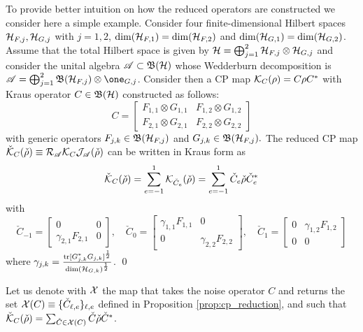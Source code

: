 \documentclass[aihp,12pt]{imsart}
\begin{document}
\begin{example}
    To provide better intuition on how the reduced operators are constructed we consider here a simple example. Consider four finite-dimensional Hilbert spaces $\mathcal{H}_{F,j},\mathcal{H}_{G,j}$ with $j=1,2$, $\dim(\mathcal{H}_{F,1}) = \dim(\mathcal{H}_{F,2})$ and $\dim(\mathcal{H}_{G,1}) = \dim(\mathcal{H}_{G,2})$. Assume that the total Hilbert space is given by $\mathcal{H}=\bigoplus_{j=1}^2 \mathcal{H}_{F,j}\otimes\mathcal{H}_{G,j}$ and consider the unital algebra $\mathscr{A}\subset\mathfrak{B}(\mathcal{H})$ whose Wedderburn decomposition is $\As = \bigoplus_{j=1}^2 \Bf(\Hc_{F,j}) \otimes \one_{G,j}$. Consider then a CP map $\mathcal{K}_{C}(\rho) = C\rho C^*$ with Kraus operator $C\in\mathfrak{B}(\mathcal{H})$ constructed as follows:
    \[C=\left[\begin{array}{c|c}
         F_{1,1}\otimes G_{1,1}& F_{1,2}\otimes G_{1,2} \\\hline
         F_{2,1}\otimes G_{2,1}& F_{2,2}\otimes G_{2,2}
    \end{array}\right]\]
    with generic operators $F_{j,k}\in\mathfrak{B}(\mathcal{H}_{F,j})$ and $G_{j,k}\in\mathfrak{B}(\mathcal{H}_{F,j}).$ The reduced CP map $\check{\mathcal{K}}_C(\check{\rho}) \equiv \mathcal{R}_{\mathscr{A}} \mathcal{K}_C \mathcal{J}_{\mathscr{A}}(\check{\rho})$ can be written in Kraus form as \[\check{\mathcal{K}}_{C}(\check{\rho}) = \sum_{e=-1}^1 \mathcal{K}_{\check{C}_e}(\check{\rho}) = \sum_{e=-1}^1 \check{C}_e \check{\rho} \check{C}_e^*\] with 
    \[\check{C}_{-1} = \left[\begin{array}{c|c}
         0& 0 \\\hline
         \gamma_{2,1}F_{2,1}& 0
    \end{array}\right],\quad
    \check{C}_{0} = \left[\begin{array}{c|c}
         \gamma_{1,1}F_{1,1}& 0 \\\hline
         0& \gamma_{2,2}F_{2,2}
    \end{array}\right],\quad
    \check{C}_{1} = \left[\begin{array}{c|c}
         0& \gamma_{1,2}F_{1,2} \\\hline
         0& 0
    \end{array}\right]\]
    where $\gamma_{j,k} = \frac{{\rm tr}[G_{j,k}^* G_{j,k}]^{\frac{1}{2}}}{\dim(\mathcal{H}_{G,k})^{\frac{1}{2}}}$. 
\qed
\end{example}

Let us denote with $\mathcal{X}$ the map that takes the noise operator $C$ and returns the set $\mathcal{X}(C)\equiv\{\check{C}_{\ell,e}\}_{\ell,e}$ defined in Proposition \ref{prop:cp_reduction}, and such that $\check{\mathcal{K}}_C(\check{\rho}) = \sum_{\check{C}\in\mathcal{X}(C)} \check{C} \check{\rho} \check{C}^*$. 
\end{document}
